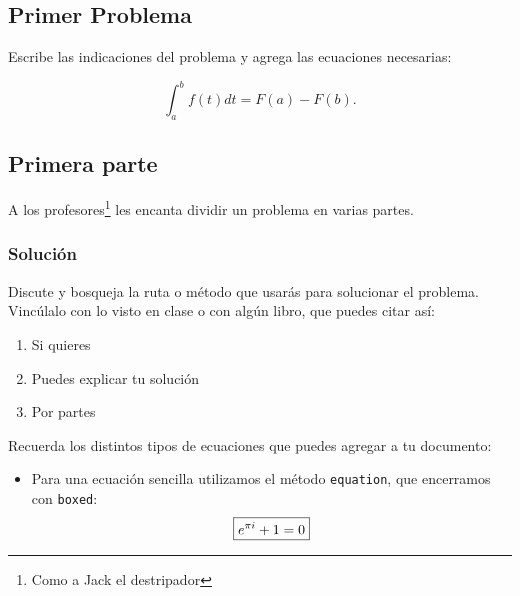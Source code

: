 \documentclass{assignment}
\date{\today}                                   %
\begin{document}
\begin{problem}

\section{Primer Problema}

\noindent Escribe las indicaciones del problema y agrega las ecuaciones necesarias:

\begin{equation}\label{eq:TeoremaFundamental}
    \int_a^b f(t)dt = F(a)-F(b).
\end{equation}

\subsection{Primera parte}

\noindent A los profesores\footnote{Como a Jack el destripador} les encanta dividir un problema en varias partes.

\subsubsection*{Solución}

\noindent Discute y bosqueja la ruta o método que usarás para solucionar el problema. Vincúlalo con lo visto en clase o con algún libro, que puedes citar así: \cite{GustavoLopez}

\begin{enumerate}
    \item Si quieres

    \item Puedes explicar tu solución

    \item Por partes
\end{enumerate}

\noindent Recuerda los distintos tipos de ecuaciones que puedes agregar a tu documento:

\begin{itemize}
    \item Para una ecuación sencilla utilizamos el método \texttt{equation}, que encerramos con \texttt{boxed}:
    \begin{equation}\label{eq:Sencilla}
        \boxed{             %
        e^{\pi i} + 1 = 0
        }
    \end{equation}


\end{itemize}
\end{problem}
\end{document}
